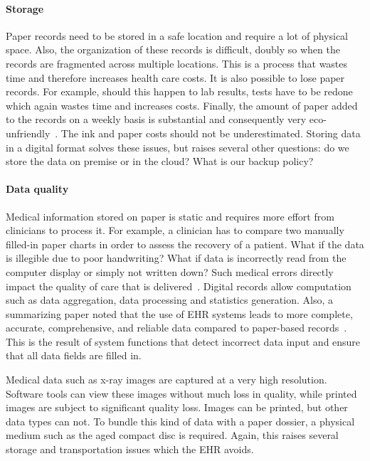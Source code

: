     \paragraph{Storage} Paper records need to be stored in a safe location and require a lot of physical space. Also, the organization of these records is difficult, doubly so when the records are fragmented across multiple locations. This is a process that wastes time and therefore increases health care costs. It is also possible to lose paper records. For example, should this happen to lab results, tests have to be redone which again wastes time and increases costs. Finally, the amount of paper added to the records on a weekly basis is substantial and consequently very eco-unfriendly~\cite{Saleem2009}. The ink and paper costs should not be underestimated. Storing data in a digital format solves these issues, but raises several other questions: do we store the data on premise or in the cloud? What is our backup policy? 

    \paragraph{Data quality} Medical information stored on paper is static and requires more effort from clinicians to process it. For example, a clinician has to compare two manually filled-in paper charts in order to assess the recovery of a patient. What if the data is illegible due to poor handwriting? What if data is incorrectly read from the computer display or simply not written down? Such medical errors directly impact the quality of care that is delivered~\cite{Elnahal2011, Hillestad2005}. Digital records allow computation such as data aggregation, data processing and statistics generation. Also, a summarizing paper noted that the use of EHR systems leads to more complete, accurate, comprehensive, and reliable data compared to paper-based records~\cite{Hayrinen2008}. This is the result of system functions that detect incorrect data input and ensure that all data fields are filled in.

    Medical data such as x-ray images are captured at a very high resolution. Software tools can view these images without much loss in quality, while printed images are subject to significant quality loss. Images can be printed, but other data types can not. To bundle this kind of data with a paper dossier, a physical medium such as the aged compact disc is required. Again, this raises several storage and transportation issues which the EHR avoids.

